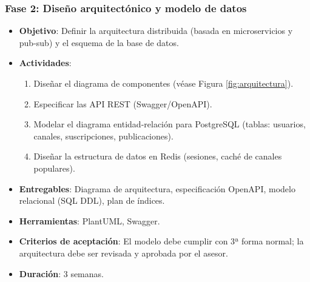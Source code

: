 \subsubsection{Fase 2: Diseño arquitectónico y modelo de datos}
\begin{itemize}
    \item \textbf{Objetivo}: Definir la arquitectura distribuida (basada en microservicios y pub-sub) y el esquema de la base de datos.
    \item \textbf{Actividades}:
        \begin{enumerate}
            \item Diseñar el diagrama de componentes (véase Figura \ref{fig:arquitectura}).
            \item Especificar las API REST (Swagger/OpenAPI).
            \item Modelar el diagrama entidad-relación para PostgreSQL (tablas: usuarios, canales, suscripciones, publicaciones).
            \item Diseñar la estructura de datos en Redis (sesiones, caché de canales populares).
        \end{enumerate}
    \item \textbf{Entregables}: Diagrama de arquitectura, especificación OpenAPI, modelo relacional (SQL DDL), plan de índices.
    \item \textbf{Herramientas}: PlantUML, Swagger.
    \item \textbf{Criterios de aceptación}: El modelo debe cumplir con 3ª forma normal; la arquitectura debe ser revisada y aprobada por el asesor.
    \item \textbf{Duración}: 3 semanas.
\end{itemize}

